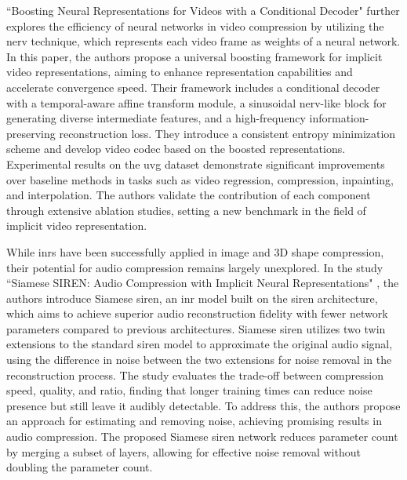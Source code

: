 \documentclass{ioereport}
\begin{document}
``Boosting Neural Representations for Videos with a Conditional Decoder" \cite{zhang2024boosting} further explores the efficiency of neural networks in video compression by utilizing the \gls{nerv} technique, which represents each video frame as weights of a neural network. In this paper, the authors propose a universal boosting framework for implicit video representations, aiming to enhance representation capabilities and accelerate convergence speed. Their framework includes a conditional decoder with a temporal-aware affine transform module, a sinusoidal \gls{nerv}-like block for generating diverse intermediate features, and a high-frequency information-preserving reconstruction loss. They introduce a consistent entropy minimization scheme and develop video \gls{codec} based on the boosted representations. Experimental results on the \gls{uvg} dataset demonstrate significant improvements over baseline methods in tasks such as video regression, compression, inpainting, and interpolation. The authors validate the contribution of each component through extensive ablation studies, setting a new benchmark in the field of implicit video representation.

While \gls{inr}s have been successfully applied in image and 3D shape compression, their potential for audio compression remains largely unexplored. In the study ``Siamese SIREN: Audio Compression with Implicit Neural Representations" \cite{lanzendörfer2023siamese}, the authors introduce Siamese \gls{siren}, an \gls{inr} model built on the \gls{siren} architecture, which aims to achieve superior audio reconstruction fidelity with fewer network parameters compared to previous architectures. Siamese \gls{siren} utilizes two twin extensions to the standard \gls{siren} model to approximate the original audio signal, using the difference in noise between the two extensions for noise removal in the reconstruction process. The study evaluates the trade-off between compression speed, quality, and ratio, finding that longer training times can reduce noise presence but still leave it audibly detectable. To address this, the authors propose an approach for estimating and removing noise, achieving promising results in audio compression. The proposed Siamese \gls{siren} network reduces parameter count by merging a subset of layers, allowing for effective noise removal without doubling the parameter count.
\end{document}
